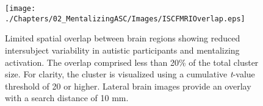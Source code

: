 \begin{figure}[!ht]
	\centering
    \texttt{[image: ./Chapters/02\_MentalizingASC/Images/ISCFMRIOverlap.eps]}
	\caption{Limited spatial overlap between brain regions showing reduced intersubject variability in autistic participants and mentalizing activation. The overlap comprised less than 20\% of the total cluster size. For clarity, the cluster is visualized using a cumulative \textit{t}-value threshold of 20 or higher. Lateral brain images provide an overlay with a search distance of 10 mm. }
    \vspace*{-10pt}
	\label{fig:isc-fmri-overlap-asc}
\end{figure}



